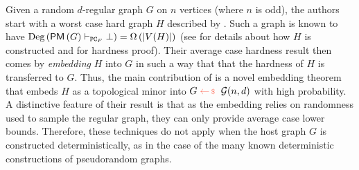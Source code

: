 \documentclass[11pt]{article}
\begin{document}
Given a random $d$-regular graph $G$ on $n$ vertices (where $n$ is odd), the authors start with a worst case hard graph $H$ described by \citet{buss1999linear}.
Such a graph is known to have $\text{Deg}\left(\mathsf{PM}\left(G\right) \vdash_{\texttt{PC}_F} \bot\right) = \Omega\left(\left|V(H)\right|\right)$ (see \citep[Appendix A]{Austrin_2022} for details about how $H$ is constructed and \citet{buss1999linear} for hardness proof).
Their average case hardness result then comes by \emph{embedding} $H$ into $G$ in such a way that that the hardness of $H$ is transferred to $G$.
Thus, the main contribution of \citet{Austrin_2022} is a novel embedding theorem that embeds $H$ as a topological minor into $G \samples \mathcal{G}(n, d)$ with high probability. 
A distinctive feature of their result is that as the embedding relies on randomness used to sample the regular graph, they can only provide average case lower bounds.
Therefore, these techniques do not apply when the host graph $G$ is constructed deterministically, as in the case of the many known deterministic constructions of pseudorandom graphs.
\end{document}
